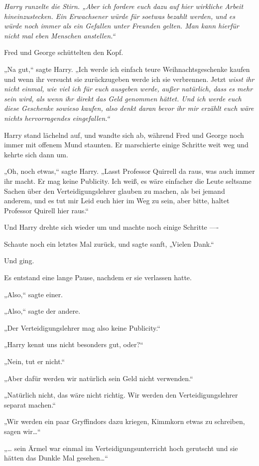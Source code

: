 {\emph{Harry runzelte die Stirn. „Aber ich fordere euch dazu auf hier wirkliche Arbeit hineinzustecken. Ein Erwachsener würde für soetwas bezahlt werden, und es würde noch immer als ein Gefallen unter Freunden gelten. Man kann hierfür nicht mal eben Menschen anstellen.“}

Fred und George schüttelten den Kopf.

„Na gut,“ sagte Harry. „Ich werde ich einfach teure Weihnachtsgeschenke kaufen und wenn ihr versucht sie zurückzugeben werde ich sie verbrennen. Jetzt \emph{wisst ihr nicht einmal, wie viel ich für euch ausgeben werde, außer natürlich, dass es mehr sein wird, als wenn ihr direkt das Geld genommen hättet. Und ich werde euch diese Geschenke \emph{sowieso} kaufen, also denkt \emph{daran} bevor ihr mir erzählt \emph{euch wäre nichts hervorragendes eingefallen.“}}

Harry stand lächelnd auf, und wandte sich ab, während Fred und George noch immer mit offenem Mund staunten. Er marschierte einige Schritte weit weg und kehrte sich dann um.

„Oh, noch etwas,“ sagte Harry. „Lasst Professor Quirrell da raus, was auch immer ihr macht. Er mag keine Publicity. Ich weiß, es wäre einfacher die Leute seltsame Sachen über den Verteidigungslehrer glauben zu machen, als bei jemand anderem, und es tut mir Leid euch hier im Weg zu sein, aber bitte, haltet Professor Quirell hier raus.“

Und Harry drehte sich wieder um und machte noch einige Schritte ----

Schaute noch ein letztes Mal zurück, und sagte sanft, „Vielen Dank.“

Und ging.

Es entstand eine lange Pause, nachdem er sie verlassen hatte.

„Also,“ sagte einer.

„Also,“ sagte der andere.

„Der Verteidigungslehrer mag also keine Publicity.“

„Harry kennt uns nicht besonders gut, oder?“

„Nein, tut er nicht.“

„Aber dafür werden wir natürlich sein Geld nicht verwenden.“

„Natürlich nicht, das wäre nicht richtig. Wir werden den Verteidigungslehrer separat machen.“

„Wir werden ein paar Gryffindors dazu kriegen, Kimmkorn etwas zu schreiben, sagen wir…“

„… sein Ärmel war einmal im Verteidigungsunterricht hoch gerutscht und sie hätten das Dunkle Mal gesehen…“

}
